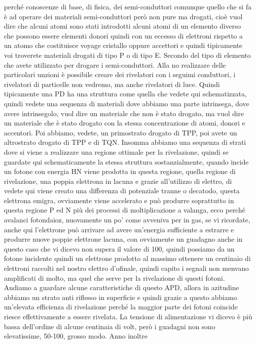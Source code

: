 perché conoscenze di base, di fisica, dei semi-conduttori comunque quello che si fa è ad operare dei materiali semi-conduttori però non pure ma drogati, cioè vuol dire che alcuni atomi sono stati introdotti alcuni atomi di un elemento diverso che possono essere elementi donori quindi con un eccesso di elettroni rispetto a un atomo che costituisce voyage cristallo oppure accettori e quindi tipicamente voi troverete materiali drogati di tipo P o di tipo E. Secondo del tipo di elemento che avete utilizzato per drogare i semi-conduttori. Alla no realizzare delle particolari unzioni è possibile creare dei rivelatori con i seguimi conduttori, i rivelatori di particelle non vedremo, ma anche rivelatori di luce. Quindi tipicamente una PD ha una struttura come quella che vedete qui schematizzata, quindi vedete una sequenza di materiali dove abbiamo una parte intrinsega, dove avere intrinsegolo, vuol dire un materiale che non è stato drogato, ma vuol dire un materiale che è stato drogato con la stessa concentrazione di atomi, donori e accentori. Poi abbiamo, vedete, un primostrato drogato di TPP, poi avete un altrostrato drogato di TPP e di TQN. Insomma abbiamo una sequenza di strati dove si viene a realizzare una regione ottimale per la rivelazione, quindi se guardate qui schematicamente la stessa struttura sostanzialmente, quando incide un fotone con energia HN viene prodotta in questa regione, quella regione di rivelazione, una poppia elettrona in lacuna e grazie all'utilizzo di elettro, di vedete qui viene creato una differenza di potenziale tranne o decatodo, questa elettrona emigra, ovviamente viene accelerato e può produrre soprattutto in questa regione P ed N più dei processi di moltiplicazione a valanga, ecco perché avalanci fotondaioz, nuovamente un po' come avveniva per in gas, se vi ricordate, anche qui l'elettrone può arrivare ad avere un'energia sufficiente a estrarre e produrre nuove poppie elettrone lacuna, con ovviamente un guadagno anche in questo caso che vi dicevo non supera il valore di 100, quindi possiamo da un fotone incidente quindi un elettrone prodotto al massimo ottenere un centinaio di elettroni raccolti nel nostro elettro d'ofinale, quindi capito i segnali non menvano amplificati di molto, ma quel che serve per la rivelazione di questi fotoni. Andiamo a guardare alcune caratteristiche di questo APD, allora in azitudine abbiamo un strato anti riflesso in superficie e quindi grazie a questo abbiamo un'elevata efficienza di rivelazione perché la maggior parte dei fotoni coincide riesce effettivamente a essere rivelata. La tensione di alimentazione vi dicevo è più bassa dell'ordine di alcune centinaia di volt, però i guadagni non sono elevatissime, 50-100, grosso modo. Anno inoltre 

